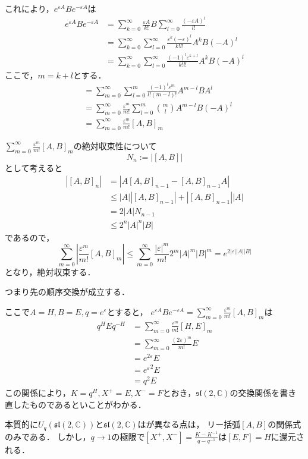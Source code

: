 \documentclass[10pt,dvipdfm]{beamer}
\newcommand{\CC}{\mathbb{C}}
\begin{document}
  \begin{frame}
    これにより，$e^{\varepsilon A}Be^{-\varepsilon A}$は
    \begin{align*}
      e^{\varepsilon A}Be^{-\varepsilon A} &= \sum_{k=0}^{\infty}\frac{\varepsilon A}{k!} B \sum_{l=0}^{\infty}\frac{(-\varepsilon A)^l}{l!} \\
      &= \sum_{k=0}^{\infty}\sum_{l=0}^{\infty}\frac{\varepsilon^k(-\varepsilon)^l}{k!l!}A^kB(-A)^l\\
      &= \sum_{k=0}^{\infty}\sum_{l=0}^{\infty}\frac{(-1)^l\varepsilon^{k+l}}{k!l!}A^kB(-A)^l
    \end{align*}
    ここで，$m=k+l$とする．
    \begin{align*}
      &= \sum_{m=0}^{\infty}\sum_{l=0}^{m}\frac{(-1)^l\varepsilon^{m}}{l!(m-l)!}A^{m-l}BA^l \\
      &= \sum_{m=0}^{\infty}\frac{\varepsilon^{m}}{m!}\sum_{l=0}^{m}\binom{m}{l}A^{m-l}B(-A)^l \\
      &= \sum_{m=0}^{\infty}\frac{\varepsilon^{m}}{m!}[A,B]_m
    \end{align*}
  \end{frame}
  \begin{frame}
    $\sum_{m=0}^{\infty}\frac{\varepsilon^{m}}{m!}[A,B]_m$の絶対収束性について
    \[
    N_n:=|[A,B]|
    \]
    として考えると
    \begin{align*}
      |[A,B]_n|&=|A[A,B]_{n-1}-[A,B]_{n-1}A|\\
      &\leq |A||[A,B]_{n-1}|+|[A,B]_{n-1}||A|\\
      &= 2|A|N_{n-1}\\
      &\leq 2^n|A|^n|B|
    \end{align*}
    であるので，
    \[
    \sum_{m=0}^{\infty}\left|\frac{\varepsilon^{m}}{m!}[A,B]_m\right| \leq \sum_{m=0}^{\infty}\frac{|\varepsilon|^m}{m!}2^m|A|^m|B|^m = e^{2|\varepsilon||A||B|}
    \]
    となり，絶対収束する．

    つまり先の順序交換が成立する．
  \end{frame}
  \begin{frame}
    ここで$A=H,B=E,q=e^{\varepsilon}$とすると，
    $e^{\varepsilon A}Be^{-\varepsilon A}=\sum_{m=0}^{\infty}\frac{\varepsilon^{m}}{m!}[A,B]_m$は
    \begin{align*}
      q^H E q^{-H} &= \sum_{m=0}^{\infty}\frac{\varepsilon^{m}}{m!}[H,E]_m\\
      &= \sum_{m=0}^{\infty}\frac{(2\varepsilon)^{m}}{m!}E\\
      &= e^{2\varepsilon}E\\
      &= {e^{\varepsilon}}^2 E\\
      &= q^2 E
    \end{align*}
    この関係により，$K = q^H,X^+=E,X^-=F$とおき，$\mathfrak{sl}(2,\CC)$の交換関係を書き直したものであるといことがわかる．

    本質的に$U_q(\mathfrak{sl}(2,\CC))$と$\mathfrak{sl}(2,\CC)$はが異なる点は，
    リー括弧$[A,B]$の関係式のみである．
    しかし，$q\to1$の極限で$[X^+,X^-]=\frac{K-K^{-1}}{q-q^{-1}}$は$[E,F]=H$に還元される．
  \end{frame}
\end{document}
